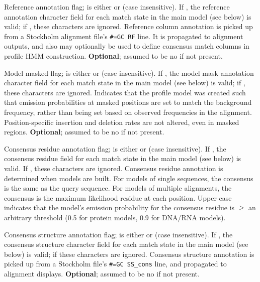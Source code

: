 \begin{sreitems}{}
\item [\monob{RF <s>}] Reference annotation flag;  is
either  or  (case insensitive). If , the
reference annotation character field for each match state in the main
model (see below) is valid; if , these characters are
ignored.  Reference column annotation is picked up from a Stockholm
alignment file's \verb+#=GC RF+ line. It is propagated to alignment
outputs, and also may optionally be used to define consensus match
columns in profile HMM construction. \textbf{Optional}; assumed to be
no if not present.

\item [\monob{MM <s>}] Model masked flag;  is
either  or  (case insensitive). If , the
model mask annotation character field for each match state in the main
model (see below) is valid; if , these characters are
ignored. Indicates that the profile model was created such that
emission probabilities at masked positions are set to match the 
background frequency, rather than being set based on observed frequencies 
in the alignment. Position-specific insertion and deletion rates are not 
altered, even in masked regions. \textbf{Optional}; assumed to be
no if not present.

\item [\monob{CONS <s>}] Consensus residue annotation flag;
   is either  or  (case insensitive).  If
  , the consensus residue field for each match state in the
  main model (see below) is valid. If , these characters are
  ignored. Consensus residue annotation is determined when models are
  built. For models of single sequences, the consensus is the same as
  the query sequence. For models of multiple alignments, the consensus
  is the maximum likelihood residue at each position. Upper case
  indicates that the model's emission probability for the consensus
  residue is $\geq$ an arbitrary threshold (0.5 for protein models,
  0.9 for DNA/RNA models).

\item [\monob{CS <s>}] Consensus structure annotation flag;
 is either  or  (case insensitive). If
, the consensus structure character field for each match
state in the main model (see below) is valid; if  these
characters are ignored. Consensus structure annotation is picked up
from a Stockholm file's \verb+#=GC SS_cons+ line, and propagated to
alignment displays.  \textbf{Optional}; assumed to be no if not
present.


\end{sreitems}
